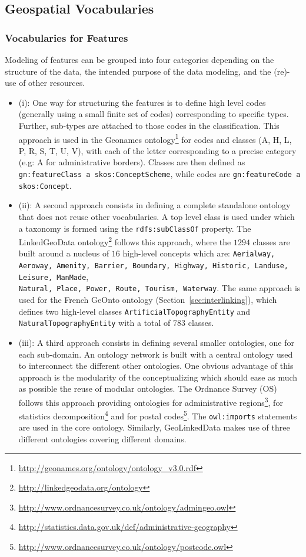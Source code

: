 \subsection{Geospatial Vocabularies}
\label{sec:geospatialvocabs} 

\subsubsection{Vocabularies for Features}
Modeling of features can be grouped into four categories depending on the structure of the data, the intended purpose of the data modeling, and the (re)-use of other resources.
\begin{itemize}
  \item (i): One way for structuring the features is to define high level codes (generally using a small finite set of codes) corresponding to specific
      types. Further, sub-types are attached to those codes in the classification. This approach is used in the Geonames ontology\footnote{\url{http://geonames.org/ontology/ontology_v3.0.rdf}} for codes and classes (A, H, L, P, R, S, T, U, V), with each of the letter corresponding to a precise category (e.g: A for administrative borders). Classes are then defined as \texttt{gn:featureClass a skos:ConceptScheme}, while codes are \texttt{gn:featureCode a skos:Concept}.
      
  \item (ii): A second approach consists in defining a complete standalone ontology that does not reuse other vocabularies. A top level class is used under which a taxonomy is formed using the \texttt{rdfs:subClassOf} property. The LinkedGeoData ontology\footnote{\url{http://linkedgeodata.org/ontology}} follows this approach, where the $1294$ classes are built around a nucleus of $16$ high-level concepts which are: \texttt{Aerialway, Aeroway, Amenity, Barrier, Boundary, Highway, Historic, Landuse, Leisure, ManMade},\\ \texttt{Natural, Place, Power, Route, Tourism, Waterway}. The same approach is used for the French GeOnto ontology (Section~\ref{sec:interlinking}), which defines two high-level classes \texttt{ArtificialTopographyEntity} and \texttt{Natural\-TopographyEntity} with a total of $783$ classes.
  
  \item (iii): A third approach consists in defining several smaller ontologies, one for each sub-domain. An ontology network is built with a central ontology used to interconnect the different other ontologies. One obvious advantage of this approach is the modularity of the conceptualizing which should ease as much as possible the reuse of modular ontologies. The Ordnance Survey (OS) follows this approach providing ontologies for administrative regions\footnote{\url{http://www.ordnancesurvey.co.uk/ontology/admingeo.owl}}, for statistics decomposition\footnote{\url{http://statistics.data.gov.uk/def/administrative-geography}} and for postal codes\footnote{\url{http://www.ordnancesurvey.co.uk/ontology/postcode.owl}}. The \texttt{owl:imports} statements are used in the core ontology. Similarly, GeoLinkedData makes use of three different ontologies covering different domains.
  

\end{itemize}
